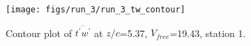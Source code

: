 \begin{figure}[H]
\centering
\texttt{[image: figs/run\_3/run\_3\_tw\_contour]}
\caption{Contour plot of $\overline{t^\prime w^\prime}$ at $z/c$=5.37, $V_{free}$=19.43, station 1.}
\label{fig:run_3_tw_contour}
\end{figure}


